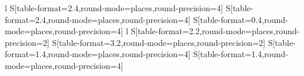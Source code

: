 \begin{landscape}
\begin{table} [h]
\renewcommand{\arraystretch}{1.3}
\caption{Parâmetros do modelo F--SAC+Disp estimados neste trabalho.
Parâmetros de volume e área $R_k$ e $Q_k$ foram obtidos diretamente de
cálculos COSMO.}
\label{tab:parSubGroups}
\footnotesize
\center
\begin{threeparttable}
\begin{tabular}{l
S[table-format=2.4,round-mode=places,round-precision=4]
S[table-format=2.4,round-mode=places,round-precision=4]
S[table-format=0.4,round-mode=places,round-precision=4]
l
S[table-format=2.2,round-mode=places,round-precision=2]
S[table-format=3.2,round-mode=places,round-precision=2]
S[table-format=1.4,round-mode=places,round-precision=4]
S[table-format=1.4,round-mode=places,round-precision=4]
}


\end{tabular}
\end{threeparttable}
\end{table}
\end{landscape}
